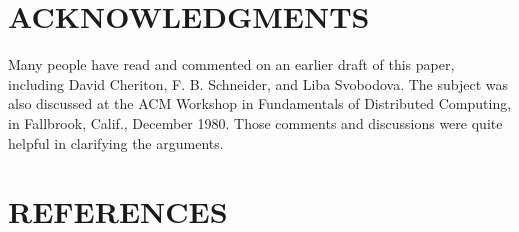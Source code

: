 \documentclass[a4paper,12pt,notitlepage,twoside,openright]{article}
\begin{document}
\hypertarget{acknowledgments}{%
\section*{ACKNOWLEDGMENTS}\label{acknowledgments}}

Many people have read and commented on an earlier draft of this paper,
including David Cheriton, F. B. Schneider, and Liba Svobodova. The
subject was also discussed at the ACM Workshop in Fundamentals of
Distributed Computing, in Fallbrook, Calif., December 1980. Those
comments and discussions were quite helpful in clarifying the arguments.

\hypertarget{references}{%
\section*{REFERENCES}\label{references}}
\end{document}
